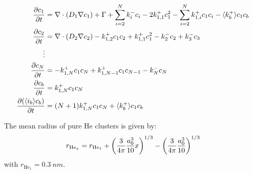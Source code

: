 \begin{subequations}
    \begin{align}
        \frac{\partial c_1}{\partial t} &= \nabla \cdot (D_1 \nabla c_1) + \Gamma + \sum\limits_{i=2}^N k_{i}^- c_i- 2k_{1, 1}^+ c_1^2 - \sum\limits_{i=2}^N k_{1,i}^+ c_1 c_i - \langle k_b^+ \rangle c_1 c_b \\
        \frac{\partial c_2}{\partial t} &= \nabla \cdot (D_2 \nabla c_2) - k_{1, 2}^+ c_1 c_2 + k_{1, 1}^+ c_1^2 - k_{2}^- c_2 + k_{3}^- c_3\\
        \vdots \nonumber\\
        \frac{\partial c_N}{\partial t} &= - k_{1, N}^+ c_1 c_N + k_{1, N-1}^+ c_1 c_{N-1} - k_{N}^- c_N\\
        \frac{\partial c_b}{\partial t} &= k_ {1,N}^+ c_1 c_N \\
        \frac{\partial (\langle i_b \rangle c_b)}{\partial t} &= (N+1)k_ {1,N}^+ c_1 c_N  + \langle k_b^+ \rangle c_1 c_b
    \end{align}
    \labeq{temporal evolution grouping}
\end{subequations}

The mean radius of pure \gls{He} clusters  is given by:
\begin{equation}
    r_{\mathrm{He}_x} = r_{\mathrm{He}_1} + \left(\frac{3}{4\pi} \frac{a_0^3}{10} x \right)^{1/3} - \left( \frac{3}{4\pi} \frac{a_0^3}{10} \right)^{1/3}
    \labeq{radius pure He}
\end{equation}
with $r_{\mathrm{He}_1} = \SI{0.3}{nm}$.

